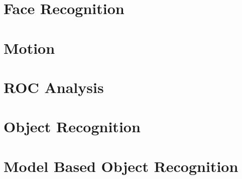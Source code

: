 \documentclass{article}
\begin{document}
	\section{Face Recognition}
	
	\section{Motion}
	
	\section{ROC Analysis}
	
	\section{Object Recognition}
	
	\section{Model Based Object Recognition}
	\newpage
	\printindex
	
\end{document}
